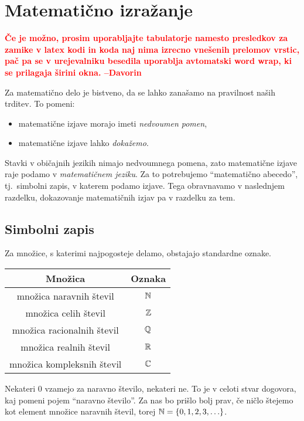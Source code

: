 \chapter{Matematično izražanje}

	
	\textcolor{red}{\small \textbf{Če je možno, prosim uporabljajte tabulatorje namesto presledkov za zamike v latex kodi in koda naj nima izrecno vnešenih prelomov vrstic, pač pa se v urejevalniku besedila uporablja avtomatski word wrap, ki se prilagaja širini okna. --Davorin}}
	
	Za matematično delo je bistveno, da se lahko zanašamo na pravilnost naših trditev. To pomeni:
	\begin{itemize}
		\item
			matematične izjave morajo imeti \emph{nedvoumen pomen},
		\item
			matematične izjave lahko \emph{dokažemo}.
	\end{itemize}
	
	Stavki v običajnih jezikih nimajo nedvoumnega pomena, zato matematične izjave raje podamo v \emph{matematičnem jeziku}. Za to potrebujemo "`matematično abecedo"', tj.~simbolni zapis, v katerem podamo izjave. Tega obravnavamo v naslednjem razdelku, dokazovanje matematičnih izjav pa v razdelku za tem.
	
	\section{Simbolni zapis}
	
		Za množice, s katerimi najpogosteje delamo, obstajajo standardne oznake.
		
		\begin{tabular}{|cc|}
			\hline
			\textbf{Množica} & \textbf{Oznaka} \\
			\hline
			množica naravnih števil & $\mathbb{N}$ \\
			množica celih števil & $\mathbb{Z}$ \\
			množica racionalnih števil & $\mathbb{Q}$ \\
			množica realnih števil & $\mathbb{R}$ \\
			množica kompleksnih števil & $\mathbb{C}$ \\
			\hline
		\end{tabular}
		
		Nekateri $0$ vzamejo za naravno število, nekateri ne. To je v celoti stvar dogovora, kaj pomeni pojem "`naravno število"'. Za nas bo prišlo bolj prav, če ničlo štejemo kot element množice naravnih števil, torej $\NN = \set{0, 1, 2, 3, \ldots}$.
		
